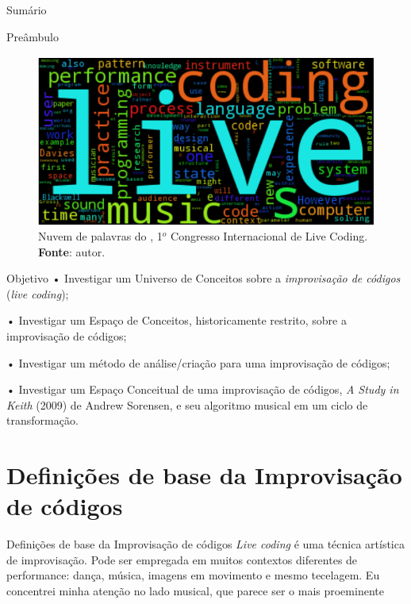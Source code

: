 \documentclass[aspectratio=169]{beamer}
\begin{document}


\begin{frame}{Sumário}
\tableofcontents
\end{frame}

\begin{frame}{Preâmbulo}
\begin{figure}
\centering
\includegraphics[scale=0.8]{imagens/nuvem.png}
\caption{Nuvem de palavras do ,  1$^o$ Congresso Internacional de Live Coding. \textbf{Fonte}: autor.}
\label{fig:nuvemlivecoding}
\end{figure}
\end{frame}

\begin{frame}{Objetivo}
• Investigar um Universo de Conceitos sobre a \emph{improvisação de códigos} (\emph{live coding});

• Investigar um Espaço de Conceitos, historicamente restrito, sobre a improvisação de códigos;

• Investigar um método de análise/criação para uma improvisação de códigos;

• Investigar um Espaço Conceitual de uma improvisação de códigos, \emph{A Study in Keith} (2009) de Andrew Sorensen, e seu algoritmo musical em um ciclo de transformação.
\end{frame}

\section{Definições de base da Improvisação de códigos}
\begin{frame}{Definições de base da Improvisação de códigos}
\emph{Live coding} é uma técnica artística de improvisação. Pode ser empregada em muitos contextos diferentes de performance: dança, música, imagens em movimento e mesmo tecelagem. Eu concentrei minha atenção no lado musical, que parece ser o mais proeminente \cite[p.~117]{mori_analysing_2015}
\end{frame}
\end{document}
